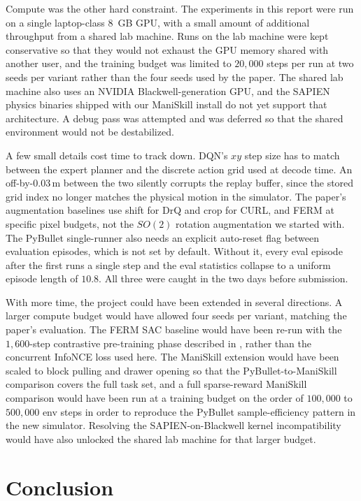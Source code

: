 \documentclass[letterpaper]{article}
\begin{document}
Compute was the other hard constraint. The experiments in this report were run on a single laptop-class $8$~GB GPU, with a small amount of additional throughput from a shared lab machine. Runs on the lab machine were kept conservative so that they would not exhaust the GPU memory shared with another user, and the training budget was limited to $20{,}000$ steps per run at two seeds per variant rather than the four seeds used by the paper. The shared lab machine also uses an NVIDIA Blackwell-generation GPU, and the SAPIEN physics binaries shipped with our ManiSkill install do not yet support that architecture. A debug pass was attempted and was deferred so that the shared environment would not be destabilized.

A few small details cost time to track down. DQN's $xy$ step size has to match between the expert planner and the discrete action grid used at decode time. An off-by-$0.03$\,m between the two silently corrupts the replay buffer, since the stored grid index no longer matches the physical motion in the simulator. The paper's augmentation baselines use shift for DrQ and crop for CURL, and FERM at specific pixel budgets, not the $SO(2)$ rotation augmentation we started with. The PyBullet single-runner also needs an explicit auto-reset flag between evaluation episodes, which is not set by default. Without it, every eval episode after the first runs a single step and the eval statistics collapse to a uniform episode length of $10.8$. All three were caught in the two days before submission.

With more time, the project could have been extended in several directions. A larger compute budget would have allowed four seeds per variant, matching the paper's evaluation. The FERM SAC baseline would have been re-run with the $1{,}600$-step contrastive pre-training phase described in \citet{zhan2020ferm}, rather than the concurrent InfoNCE loss used here. The ManiSkill extension would have been scaled to block pulling and drawer opening so that the PyBullet-to-ManiSkill comparison covers the full task set, and a full sparse-reward ManiSkill comparison would have been run at a training budget on the order of $100{,}000$ to $500{,}000$ env steps in order to reproduce the PyBullet sample-efficiency pattern in the new simulator. Resolving the SAPIEN-on-Blackwell kernel incompatibility would have also unlocked the shared lab machine for that larger budget.

\section{Conclusion}
\end{document}
